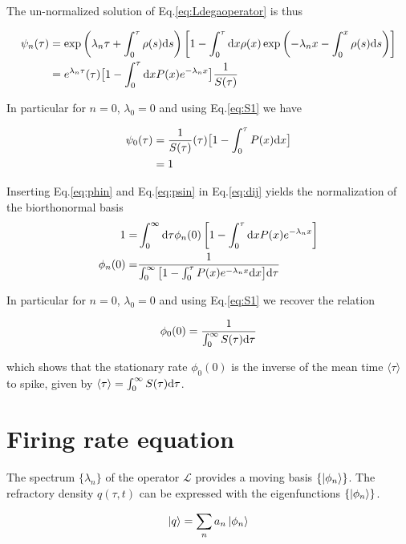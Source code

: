 \documentclass[12pt,twoside]{report}
\def \dd  {{\rm d}}
\begin{document}
The un-normalized solution of Eq.\eqref{eq:Ldegaoperator} is thus

\begin{align}
\label{eq:psin}
\psi_n(\tau)&=\exp\left(\lambda_n\tau+\int_0^\tau\rho(s)\dd s\right)\left[1-\int^\tau_0\dd x \rho(x) \exp\left(-\lambda_nx-\int_0^x\rho(s)\dd s\right)\right]\nonumber\\
&=e^{\lambda_n\tau}(\tau)\big[1-\int^\tau_0 \dd x P(x) e^{-\lambda_nx}\big]\frac{1}{S(\tau)}
\end{align}

In particular for $n=0$, $\lambda_0=0$ and using Eq.\eqref{eq:S1}  we have 

\begin{align}
\label{eq:psi0}
\psi_0(\tau)&=\frac{1}{S(\tau)}(\tau)\big[1-\int^\tau_0P(x) \dd x \big] \nonumber \\
&=1
\end{align}

 Inserting Eq.\eqref{eq:phin} and Eq.\eqref{eq:psin} in Eq.\eqref{eq:dij} yields the normalization of the biorthonormal basis 
\begin{align}
\label{eq:normalization}
1=&\int_0^{\infty}\dd \tau\phi_n(0)\left[1-\int^\tau_0 \dd x P(x) e^{-\lambda_nx}\right] \\
\phi_n(0) =&\frac{1}{\int_0^{\infty}\big[1-\int^\tau_0 P(x) e^{-\lambda_nx}\dd x\big]\dd\tau}
\end{align}


In particular for $n=0$, $\lambda_0=0$ and using Eq.\eqref{eq:S1} we recover the relation

\begin{equation}
\phi_0(0) = \frac{1}{\int_0^{\infty}S(\tau)\dd\tau}
\end{equation}

which shows that the stationary rate $\phi_0(0)$ is the inverse of the mean time $\langle\tau\rangle$ to spike, given by $\langle\tau\rangle=\int_0^{\infty}S(\tau)\dd\tau$.

\section{Firing rate equation}
\label{sec:emissionrateequation}

The spectrum $\{\lambda_n\}$ of the operator $\mathcal{L}$ provides a moving basis $ \{\ket{\phi_n}\}$. The refractory density $q(\tau,t)$ can be expressed with the eigenfunctions  $ \{\ket{\phi_n}\}$. 

\begin{equation}
\label{eq:q}
\ket{q}=\sum_na_n\ket{\phi_n}
\end{equation}
\end{document}
